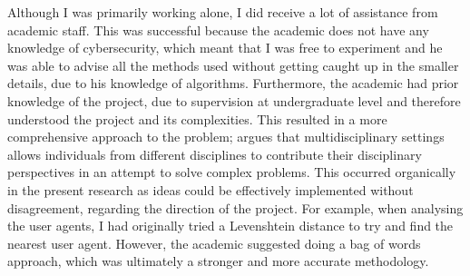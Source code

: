 Although I was primarily working alone, I did receive a lot of assistance from academic staff. This was successful because the academic does not have any knowledge of cybersecurity, which meant that I was free to experiment and he was able to advise all the methods used without getting caught up in the smaller details, due to his knowledge of algorithms. Furthermore, the academic had prior knowledge of the project, due to supervision at undergraduate level and therefore understood the project and its complexities. This resulted in a more comprehensive approach to the problem; \cite{thurow1999dynamics} argues that multidisciplinary settings allows individuals from different disciplines to contribute their disciplinary perspectives in an attempt to solve complex problems. This occurred organically in the present research as ideas could be effectively implemented without disagreement, regarding the direction of the project. For example, when analysing the user agents, I had originally tried a Levenshtein distance to try and find the nearest user agent. However, the academic suggested doing a bag of words approach, which was ultimately a stronger and more accurate methodology. 




